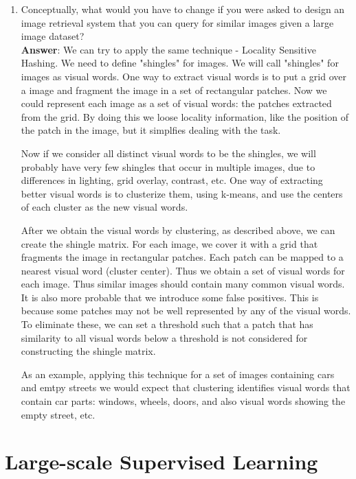 \documentclass[11pt]{article}
\begin{document}
\begin{enumerate}
\item Conceptually, what would you have to change if you were asked to design
an image retrieval system that you can query for similar images given a large
image dataset? \\
\textbf{Answer}:
We can try to apply the same technique - Locality Sensitive Hashing. We need to
define "shingles" for images. We will call "shingles" for images as visual
words. One way to extract visual words is to put a grid over a image and
fragment the image in a set of rectangular patches. Now we could represent each
image as a set of visual words: the patches extracted from the grid. By doing
this we loose locality information, like the position of the patch in the
image, but it simplfies dealing with the task.

Now if we consider all distinct visual words to be the shingles, we will
probably have very few shingles that occur in multiple images, due to
differences in lighting, grid overlay, contrast, etc. One way of extracting
better visual words is to clusterize them, using k-means, and use the centers
of each cluster as the new visual words. 

After we obtain the visual words by clustering, as described above, we can
create the shingle matrix. For each image, we cover it with a grid that
fragments the image in rectangular patches. Each patch can be mapped to a
nearest visual word (cluster center). Thus we obtain a set of visual words for
each image. Thus similar images should contain many common visual words. It is
also more probable that we introduce some false positives. This is because some
patches may not be well represented by any of the visual words. To eliminate
these, we can set a threshold such that a patch that has similarity to all
visual words below a threshold is not considered for constructing the shingle
matrix.

As an example, applying this technique for a set of images containing cars and
emtpy streets we would expect that clustering identifies visual words that
contain car parts: windows, wheels, doors, and also visual words showing the
empty street, etc.

\end{enumerate}

\section{Large-scale Supervised Learning}
\end{document}

